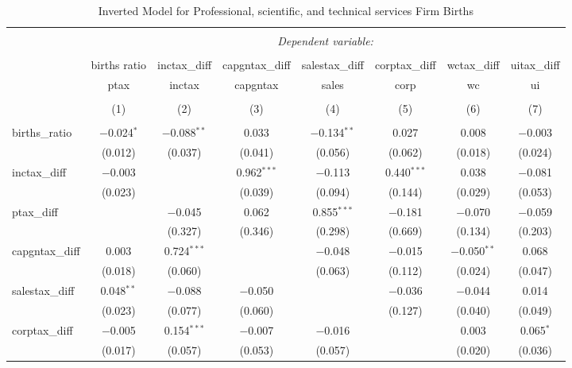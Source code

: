 
\begin{table}[!htbp] \centering 
  \caption{Inverted Model for  Professional, scientific, and technical services Firm Births} 
  \label{54rd} 
\footnotesize 
\begin{tabular}{@{\extracolsep{5pt}}lccccccc} 
\\[-1.8ex]\hline 
\hline \\[-1.8ex] 
 & \multicolumn{7}{c}{\textit{Dependent variable:}} \\ 
\cline{2-8} 
\\[-1.8ex] & births ratio & inctax\_diff & capgntax\_diff & salestax\_diff & corptax\_diff & wctax\_diff & uitax\_diff \\ 
 & ptax & inctax & capgntax & sales & corp & wc & ui \\ 
\\[-1.8ex] & (1) & (2) & (3) & (4) & (5) & (6) & (7)\\ 
\hline \\[-1.8ex] 
 births\_ratio & $-$0.024$^{*}$ & $-$0.088$^{**}$ & 0.033 & $-$0.134$^{**}$ & 0.027 & 0.008 & $-$0.003 \\ 
  & (0.012) & (0.037) & (0.041) & (0.056) & (0.062) & (0.018) & (0.024) \\ 
  inctax\_diff & $-$0.003 &  & 0.962$^{***}$ & $-$0.113 & 0.440$^{***}$ & 0.038 & $-$0.081 \\ 
  & (0.023) &  & (0.039) & (0.094) & (0.144) & (0.029) & (0.053) \\ 
  ptax\_diff &  & $-$0.045 & 0.062 & 0.855$^{***}$ & $-$0.181 & $-$0.070 & $-$0.059 \\ 
  &  & (0.327) & (0.346) & (0.298) & (0.669) & (0.134) & (0.203) \\ 
  capgntax\_diff & 0.003 & 0.724$^{***}$ &  & $-$0.048 & $-$0.015 & $-$0.050$^{**}$ & 0.068 \\ 
  & (0.018) & (0.060) &  & (0.063) & (0.112) & (0.024) & (0.047) \\ 
  salestax\_diff & 0.048$^{**}$ & $-$0.088 & $-$0.050 &  & $-$0.036 & $-$0.044 & 0.014 \\ 
  & (0.023) & (0.077) & (0.060) &  & (0.127) & (0.040) & (0.049) \\ 
  corptax\_diff & $-$0.005 & 0.154$^{***}$ & $-$0.007 & $-$0.016 &  & 0.003 & 0.065$^{*}$ \\ 
  & (0.017) & (0.057) & (0.053) & (0.057) &  & (0.020) & (0.036) \\ 

\end{tabular}
\end{table}
